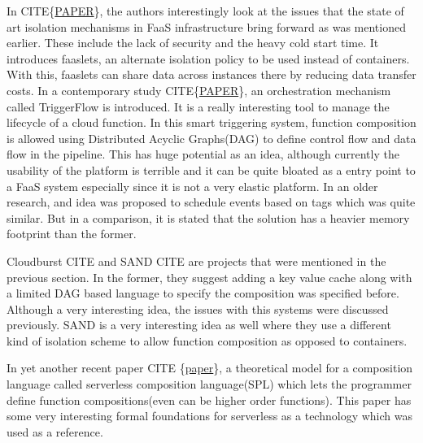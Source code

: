 \documentclass[12pt,titlepage]{article}
\begin{document}
In CITE\{\href{https://arxiv.org/abs/2002.09344}{PAPER}\}, the authors interestingly look at the issues that the state of art
isolation mechanisms in FaaS infrastructure bring forward as was mentioned
earlier. These include the lack of security and the heavy cold start time. It
introduces faaslets, an alternate isolation policy to be used instead of
containers. With this, faaslets can share data across instances there by
reducing data transfer costs. In a contemporary study CITE\{\href{https://arxiv.org/pdf/2006.08654.pdf}{PAPER}\}, an
orchestration mechanism called TriggerFlow is introduced. It is a really
interesting tool to manage the lifecycle of a cloud function. In this smart
triggering system, function composition is allowed using Distributed Acyclic
Graphs(DAG) to define control flow and data flow in the pipeline. This has huge
potential as an idea, although currently the usability of the platform is
terrible and it can be quite bloated as a entry point to a FaaS system
especially since it is not a very elastic platform. In an older research, and
idea was proposed to schedule events based on tags which was quite similar. But
in a comparison, it is stated that the solution has a heavier memory footprint
than the former.


Cloudburst CITE and SAND CITE are projects that were mentioned in the previous
section. In the former, they suggest adding a key value cache along with
a limited DAG based language to specify the composition was specified before.
Although a very interesting idea, the issues with this systems were discussed
previously. SAND is a very interesting idea as well where they use a different
kind of isolation scheme to allow function composition as opposed to containers. 

In yet another recent paper CITE \{\href{https://arxiv.org/pdf/1902.05870.pdf}{paper}\}, a theoretical model for a composition
language called serverless composition language(SPL) which lets the programmer
define function compositions(even can be higher order functions). This paper has
some very interesting formal foundations for serverless as a technology which
was used as a reference.
\end{document}
